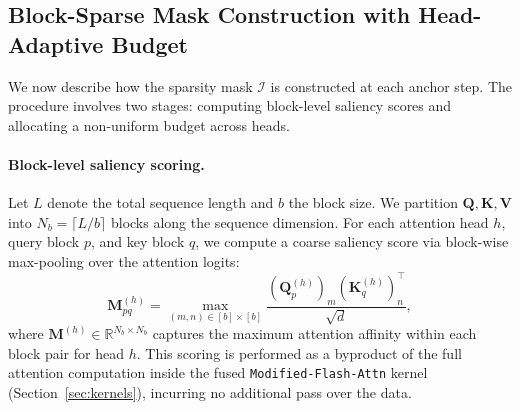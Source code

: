 \subsection{Block-Sparse Mask Construction with Head-Adaptive Budget}
\label{sec:mask_construction}

We now describe how the sparsity mask $\mathcal{I}$ is constructed at each anchor step. The procedure involves two stages: computing block-level saliency scores and allocating a non-uniform budget across heads.

\paragraph{Block-level saliency scoring.}
Let $L$ denote the total sequence length and $b$ the block size. We partition $\mathbf{Q}, \mathbf{K}, \mathbf{V}$ into $N_b = \lceil L/b \rceil$ blocks along the sequence dimension. For each attention head $h$, query block $p$, and key block $q$, we compute a coarse saliency score via block-wise max-pooling over the attention logits:
\begin{equation}
    \mathbf{M}^{(h)}_{pq} = \max_{(m,n) \in [b] \times [b]} \frac{(\mathbf{Q}^{(h)}_p)_m (\mathbf{K}^{(h)}_q)_n^\top}{\sqrt{d}},
\end{equation}
where $\mathbf{M}^{(h)} \in \mathbb{R}^{N_b \times N_b}$ captures the maximum attention affinity within each block pair for head $h$. This scoring is performed as a byproduct of the full attention computation inside the fused \texttt{Modified-Flash-Attn} kernel (Section~\ref{sec:kernels}), incurring no additional pass over the data.

